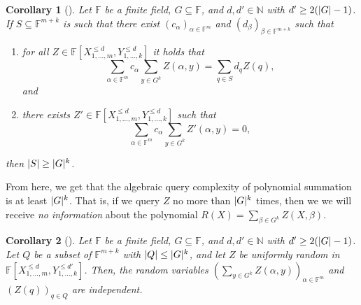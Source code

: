 \documentclass[english,12pt]{reedthesis}
\theoremstyle{plain}
\newtheorem{cor}[cor]{Corollary}
\theoremstyle{definition}
\theoremstyle{remark}
\DeclarePairedDelimiter{\abs}{\lvert}{\rvert}
\begin{document}
\begin{cor}[{\cite[Corollary 12.2]{CFGS22}}]\label{cor:sum-c-z}
  Let $\mathbb{F}$ be a finite field, $G \subseteq \mathbb{F}$, and $d, d' \in \mathbb{N}$ with
  $d' \ge 2(\abs{G} - 1)$. If $S \subseteq \mathbb{F}^{m+k}$ is such that there exist
  $(c_{\alpha})_{\alpha \in \mathbb{F}^{m}}$ and $(d_{\beta})_{\beta \in \mathbb{F}^{m+k}}$ such that
  \begin{enumerate}
    \item for all $Z \in \mathbb{F}[X_{1, \ldots, m}^{\le d}, Y_{1, \ldots, k}^{\le d}]$ it
          holds that
          \begin{equation}\label{eqn:sum-c-z-d-z}
            \sum_{\alpha \in \mathbb{F}^{m}}c_{\alpha}\sum_{y \in G^{k}}Z(\alpha, y) = \sum_{q \in S}d_{q}Z(q),
          \end{equation}
          and
    \item there exists $Z' \in \mathbb{F}[X_{1, \ldots, m}^{\le d}, Y_{1, \ldots, k}^{\le d}]$
          such that
          \begin{equation}\label{eqn:sum-c-z-zero}
            \sum_{\alpha \in \mathbb{F}^{m}}c_{\alpha}\sum_{y \in G^{k}}Z'(\alpha, y) = 0,
          \end{equation}
  \end{enumerate}
  then $\abs{S} \ge \abs{G}^{k}$.
\end{cor}

From here, we get that the algebraic query complexity of polynomial summation is
at least $\abs{G}^{k}$. That is, if we query $Z$ no more than $\abs{G}^{k}$
times, then we we will receive \emph{no information} about the polynomial
$R(X) = \sum_{\beta \in G^{k}}Z(X, \beta)$.

\begin{cor}[{\cite[Corollary 12.3]{CFGS22}}]\label{cor:indep-ensemble}
  Let $\mathbb{F}$ be a finite field, $G \subseteq \mathbb{F}$, and $d, d' \in \mathbb{N}$ with
  $d' \ge 2(\abs{G} - 1)$. Let $Q$ be a subset of $\mathbb{F}^{m+k}$ with
  $\abs{Q} \le \abs{G}^{k}$, and let $Z$ be uniformly random in
  $\mathbb{F}[X_{1, \ldots, m}^{\le d}, Y_{1, \ldots, k}^{\le d'}]$. Then, the random
  variables $(\sum_{y \in G^{k}}Z(\alpha, y))_{\alpha \in \mathbb{F}^{m}}$ and $(Z(q))_{q \in Q}$
  are independent.
\end{cor}
\end{document}
